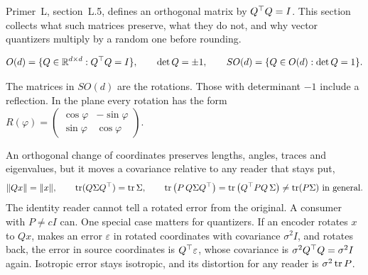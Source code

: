 Primer~L, section~L.5, defines an orthogonal matrix by $Q^{\top} Q=I$. This section
collects what such matrices preserve, what they do not, and why vector
quantizers multiply by a random one before rounding.

\begin{definition}\label{def:ch01:orth}
\begin{equation}\label{eq:ch01:orth}
O(d)=\{Q\in\mathbb{R}^{d\times d}: Q^{\top} Q=I\},\qquad \det Q=\pm1,\qquad
SO(d)=\{Q\in O(d):\det Q=1\}.
\end{equation}
\end{definition}
The matrices in $SO(d)$ are the rotations. Those with determinant $-1$ include
a reflection. In the plane every rotation has the form
$R(\varphi)=\begin{pmatrix}\cos\varphi&-\sin\varphi\\ \sin\varphi&\cos\varphi\end{pmatrix}$.

An orthogonal change of coordinates preserves lengths, angles, traces and
eigenvalues, but it moves a covariance relative to any reader that stays put,
\begin{equation}\label{eq:ch01:orthinv}
\norm{Qx}=\norm{x},\qquad \tr(Q\Sigma Q\T)=\tr\Sigma,\qquad
\tr\big(P\,Q\Sigma Q\T\big)=\tr\big(Q\T PQ\,\Sigma\big)\neq\tr(P\Sigma)\ \text{in general}.
\end{equation}
The identity reader cannot tell a rotated error from the original. A consumer
with $P\neq cI$ can. One special case matters for quantizers. If an encoder
rotates $x$ to $Qx$, makes an error $\varepsilon$ in rotated coordinates with
covariance $\sigma^2I$, and rotates back, the error in source coordinates is
$Q^{\top}\varepsilon$, whose covariance is $\sigma^2Q^{\top} Q=\sigma^2I$ again. Isotropic
error stays isotropic, and its distortion for any reader is $\sigma^2\operatorname{tr} P$.

